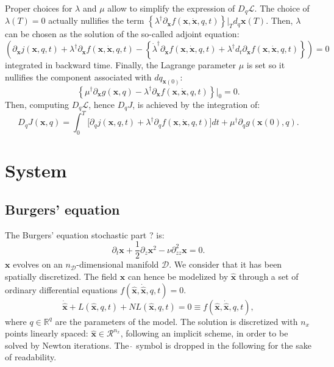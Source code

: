 \documentclass[aip,pof,nofootinbib,reprint,onecolumn]{revtex4-1}
\newcommand{\todo}[1]{{\color{red} #1 }}
\newcommand{\gras}[1]{\boldsymbol{#1}}
\newcommand{\mypar}[1]{\left(#1\right)}
\newcommand{\mya}[1]{\left\{#1\right\}}
\newcommand{\Ephaz}{\mathcal{D}}%
\newcommand{\Nphaz}{n_{\mathcal{D}}} %
\newcommand{\fdyn}{f} %
\newcommand{\costf}{J} %
\newcommand{\costff}{j} %
\newcommand{\lag}{\mathcal{L}} %
\newcommand{\point}{\gras{x}} %
\begin{document}
Proper choices for $\lambda$ and $\mu$ allow to simplify the expression of $D_q\lag$.
The choice of $\lambda\mypar{T} = 0$ actually nullifies the term $\mya{\lambda^{\dagger}\partial_{\dot{\point}} \fdyn(\point,\dot{\point},q,t)}|_T d_q \point(T)$.
Then, $\lambda$ can be chosen as the solution of the so-called adjoint equation:
$$
\mypar{\partial_{\point}\costff(\point,q,t) + \lambda^{\dagger} \partial_{\point}  \fdyn(\point,\dot{\point},q,t) - \mya{\dot{\lambda}^{\dagger}\partial_{\dot{\point}} \fdyn(\point,\dot{\point},q,t) + \lambda^{\dagger}d_t\partial_{\dot{\point}}\fdyn(\point,\dot{\point},q,t)}} = 0 
$$
integrated in backward time. 
Finally, the Lagrange parameter $\mu$ is set so it nullifies the component associated with $dq_{\point(0)}$:
$$ \mya{\mu^{\dagger} \partial_{\point} g(\point,q) - \lambda^{\dagger}\partial_{\dot{\point}} \fdyn(\point,\dot{\point},q,t) }|_0 = 0.$$
Then, computing $D_q\lag$, hence $ D_q\costf$, is achieved by the integration of:
\begin{equation}
D_q\costf\mypar{\point,q} = \int_0^T  \bigg[  \partial_{q} \costff(\point,q,t)    + \lambda^{\dagger}\partial_q\fdyn(\point,\dot{\point},q,t) \bigg] dt +   \mu^{\dagger} \partial_q g(\point(0),q).
\label{eq-J_adj}
\end{equation}




%
\section{System}
\label{sec-sys}

\subsection{Burgers' equation}
\label{ssec-burgers}
The Burgers' equation \todo{stochastic part ?}is:
$$ \partial_t \point + \frac{1}{2} \partial_z \point^2 - \nu \partial^2_{zz}\point = 0. $$
$\point$ evolves on an $\Nphaz$-dimensional manifold $\Ephaz$. 
We consider that it has been spatially discretized. The field $\point$ can hence be modelized by $\hat{\point}$ through a set of ordinary differential equations $ \fdyn(\hat{\point},\dot{\hat{\point}},q,t) =0.$
$$ \dot{\hat{\point}} + L(\hat{\point},q,t) + NL(\hat{\point},q,t) = 0 \equiv \fdyn(\hat{\point},\dot{\hat{\point}},q,t), $$
where $q\in \mathbb{R}^{q}$ are the parameters of the model.
The solution is discretized with $n_x$ points linearly spaced: $\hat{\point}\in \mathcal{R}^{n_x}$, following an implicit scheme, in order to be solved by Newton iterations. The $\hat{\,}$ symbol is dropped in the following for the sake of readability.
\end{document}
